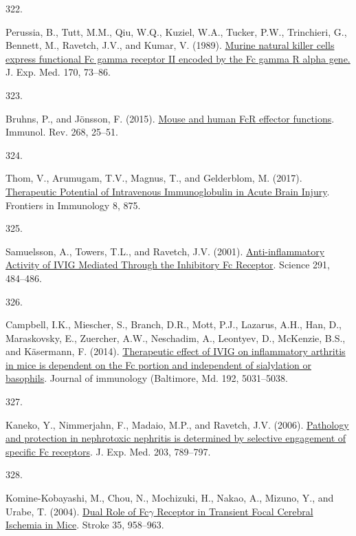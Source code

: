 \documentclass[
]{article}
\newlength{\cslhangindent}
\newlength{\csllabelwidth}
\newlength{\cslentryspacingunit} %
\newenvironment{CSLReferences}[2] %
 {%
  \setlength{\parindent}{0pt}
  \ifodd #1
  \let\oldpar\par
  \def\par{\hangindent=\cslhangindent\oldpar}
  \fi
  \setlength{\parskip}{#2\cslentryspacingunit}
 }%
 {}
\newcommand{\CSLLeftMargin}[1]{\parbox[t]{\csllabelwidth}{#1}}
\newcommand{\CSLRightInline}[1]{\parbox[t]{\linewidth - \csllabelwidth}{#1}\break}
\begin{document}
\begin{CSLReferences}{0}{0}
\leavevmode{}%
\CSLLeftMargin{322. }
\CSLRightInline{Perussia, B., Tutt, M.M., Qiu, W.Q., Kuziel, W.A., Tucker, P.W., Trinchieri, G., Bennett, M., Ravetch, J.V., and Kumar, V. (1989). \href{https://doi.org/10.1084/jem.170.1.73}{Murine natural killer cells express functional {Fc} gamma receptor {II} encoded by the {Fc} gamma {R} alpha gene.} J. Exp. Med. 170, 73--86.}

\leavevmode{}%
\CSLLeftMargin{323. }
\CSLRightInline{Bruhns, P., and Jönsson, F. (2015). \href{https://doi.org/10.1111/imr.12350}{Mouse and human {FcR} effector functions}. Immunol. Rev. 268, 25--51.}

\leavevmode{}%
\CSLLeftMargin{324. }
\CSLRightInline{Thom, V., Arumugam, T.V., Magnus, T., and Gelderblom, M. (2017). \href{https://doi.org/10.3389/fimmu.2017.00875}{Therapeutic {Potential} of {Intravenous Immunoglobulin} in {Acute Brain Injury}}. Frontiers in Immunology 8, 875.}

\leavevmode{}%
\CSLLeftMargin{325. }
\CSLRightInline{Samuelsson, A., Towers, T.L., and Ravetch, J.V. (2001). \href{https://doi.org/10.1126/science.291.5503.484}{Anti-inflammatory {Activity} of {IVIG Mediated Through} the {Inhibitory Fc Receptor}}. Science 291, 484--486.}

\leavevmode{}%
\CSLLeftMargin{326. }
\CSLRightInline{Campbell, I.K., Miescher, S., Branch, D.R., Mott, P.J., Lazarus, A.H., Han, D., Maraskovsky, E., Zuercher, A.W., Neschadim, A., Leontyev, D., McKenzie, B.S., and Käsermann, F. (2014). \href{https://doi.org/10.4049/jimmunol.1301611}{Therapeutic effect of {IVIG} on inflammatory arthritis in mice is dependent on the {Fc} portion and independent of sialylation or basophils}. Journal of immunology (Baltimore, Md. 192, 5031--5038.}

\leavevmode{}%
\CSLLeftMargin{327. }
\CSLRightInline{Kaneko, Y., Nimmerjahn, F., Madaio, M.P., and Ravetch, J.V. (2006). \href{https://doi.org/10.1084/jem.20051900}{Pathology and protection in nephrotoxic nephritis is determined by selective engagement of specific {Fc} receptors}. J. Exp. Med. 203, 789--797.}

\leavevmode{}%
\CSLLeftMargin{328. }
\CSLRightInline{Komine-Kobayashi, M., Chou, N., Mochizuki, H., Nakao, A., Mizuno, Y., and Urabe, T. (2004). \href{https://doi.org/10.1161/01.STR.0000120321.30916.8E}{Dual {Role} of {Fc\(\gamma\) Receptor} in {Transient Focal Cerebral Ischemia} in {Mice}}. Stroke 35, 958--963.}

\end{CSLReferences}
\end{document}
